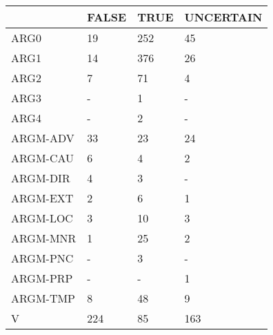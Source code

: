 \begin{tabular}{llll}
\toprule
{} & FALSE & TRUE & UNCERTAIN \\
\midrule
ARG0     &    19 &  252 &        45 \\
ARG1     &    14 &  376 &        26 \\
ARG2     &     7 &   71 &         4 \\
ARG3     &     - &    1 &         - \\
ARG4     &     - &    2 &         - \\
ARGM-ADV &    33 &   23 &        24 \\
ARGM-CAU &     6 &    4 &         2 \\
ARGM-DIR &     4 &    3 &         - \\
ARGM-EXT &     2 &    6 &         1 \\
ARGM-LOC &     3 &   10 &         3 \\
ARGM-MNR &     1 &   25 &         2 \\
ARGM-PNC &     - &    3 &         - \\
ARGM-PRP &     - &    - &         1 \\
ARGM-TMP &     8 &   48 &         9 \\
V        &   224 &   85 &       163 \\
\bottomrule
\end{tabular}
